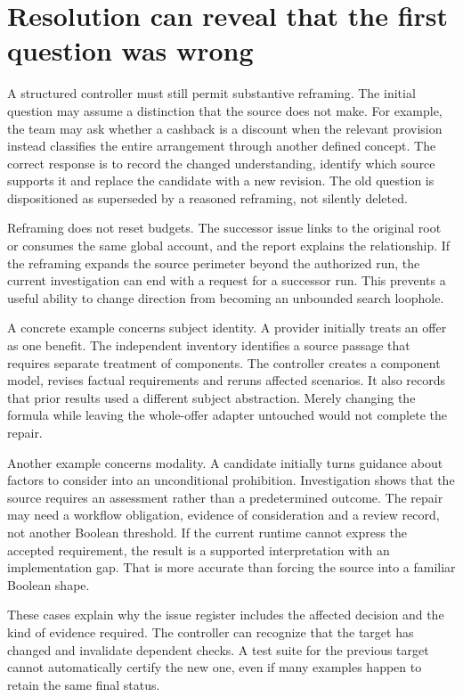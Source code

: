 \section{Resolution can reveal that the first question was wrong}

A structured controller must still permit substantive reframing. The initial
question may assume a distinction that the source does not make. For example,
the team may ask whether a cashback is a discount when the relevant provision
instead classifies the entire arrangement through another defined concept.
The correct response is to record the changed understanding, identify which
source supports it and replace the candidate with a new revision. The old question
is dispositioned as superseded by a reasoned reframing, not silently deleted.

Reframing does not reset budgets. The successor issue links to the original root
or consumes the same global account, and the report explains the relationship.
If the reframing expands the source perimeter beyond the authorized run, the
current investigation can end with a request for a successor run. This prevents a
useful ability to change direction from becoming an unbounded search loophole.

A concrete example concerns subject identity. A provider initially treats an
offer as one benefit. The independent inventory identifies a source passage that
requires separate treatment of components. The controller creates a component
model, revises factual requirements and reruns affected scenarios. It also records
that prior results used a different subject abstraction. Merely changing the
formula while leaving the whole-offer adapter untouched would not complete the
repair.

Another example concerns modality. A candidate initially turns guidance about
factors to consider into an unconditional prohibition. Investigation shows that
the source requires an assessment rather than a predetermined outcome. The repair
may need a workflow obligation, evidence of consideration and a review record,
not another Boolean threshold. If the current runtime cannot express the accepted
requirement, the result is a supported interpretation with an implementation gap.
That is more accurate than forcing the source into a familiar Boolean shape.

These cases explain why the issue register includes the affected decision and the
kind of evidence required. The controller can recognize that the target has
changed and invalidate dependent checks. A test suite for the previous target
cannot automatically certify the new one, even if many examples happen to retain
the same final status.

